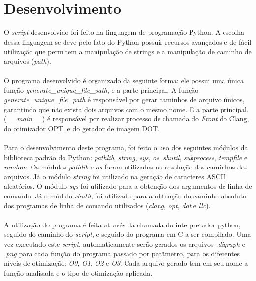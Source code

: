 \documentclass[12pt]{article}
\begin{document}
\section{Desenvolvimento}

\paragraph{}O \textit{script} desenvolvido foi feito na linguagem de programação Python. A escolha dessa linguagem se deve pelo fato do Python possuir recursos avançados e de fácil utilização que permitem a manipulação de strings e a manipulação de caminho de arquivos (\textit{path}).

\paragraph{}O programa desenvolvido é organizado da seguinte forma: ele possui uma única função \textit{generate\_unique\_file\_path}, e a parte principal. A função \textit{generate\_unique\_file\_path} é responsável por gerar caminhos de arquivo únicos, garantindo que não exista dois arquivos com o mesmo nome. E a parte principal, (\textit{\_\_main\_\_}) é responsável por realizar processo de chamada do \textit{Front} do Clang, do otimizador OPT, e do gerador de imagem DOT.

\paragraph{}Para o desenvolvimento deste programa, foi feito o uso dos seguintes módulos da biblioteca padrão do Python: \textit{pathlib}, \textit{string}, \textit{sys}, \textit{os}, \textit{shutil}, \textit{subprocess}, \textit{tempfile} e \textit{random}. Os módulos \textit{pathlib} e \textit{os} foram utilizados na resolução dos caminhos dos arquivos. Já o módulo \textit{string} foi utilizado na geração de caracteres ASCII aleatórios. O módulo \textit{sys} foi utilizado para a obtenção dos argumentos de linha de comando. Já o módulo \textit{shutil}, foi utilizado para a obtenção do caminho absoluto dos programas de linha de comando utilizados (\textit{clang}, \textit{opt}, \textit{dot} e \textit{llc}).

\paragraph{}A utilização do programa é feita através da chamada do interpretador python, seguido do caminho do \textit{script}, e seguido do programa em C a ser compilado. Uma vez executado este \textit{script}, automaticamente serão gerados os arquivos \textit{.digraph} e \textit{.png} para cada função do programa passado por parâmetro, para os diferentes níveis de otimização: \textit{O0}, \textit{O1}, \textit{O2} e \textit{O3}. Cada arquivo gerado tem em seu nome a função analisada e o tipo de otimização aplicada.
\end{document}
